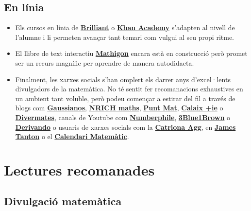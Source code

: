 \documentclass[a4paper, 12pt]{article}
\begin{document}
        \subsection*{En línia}

            \begin{itemize}
                \item Els cursos en línia de \href{https://brilliant.org/courses/}{\textbf{Brilliant}} o \href{https://es.khanacademy.org/}{\textbf{Khan Academy}} s'adapten al nivell de l'alumne i li permeten avançar tant temari com vulgui al seu propi ritme.
                \item El llibre de text interactiu \href{https://mathigon.org/}{\textbf{Mathigon}} encara està en construcció però promet ser un recurs magnífic per aprendre de manera autodidacta.
                \item Finalment, les xarxes socials s'han omplert els darrer anys d'excel·lents divulgadors de la matemàtica. No té sentit fer recomanacions exhaustives en un ambient tant voluble, però podeu començar a estirar del fil a través de blogs com \href{https://www.gaussianos.com/}{\textbf{Gaussianos}}, \href{https://nrich.maths.org/}{\textbf{NRICH maths}}, \href{https://puntmat.blogspot.com/}{\textbf{Punt Mat}}, \href{https://calaix2.blogspot.com/}{\textbf{Calaix +ie}} o \href{http://divermates.es/blog/}{\textbf{Divermates}}, canals de Youtube com \href{https://www.youtube.com/channel/UCoxcjq-8xIDTYp3uz647V5A}{\textbf{Numberphile}}, \href{https://www.youtube.com/c/3blue1brown}{\textbf{3Blue1Brown}} o \href{https://www.youtube.com/channel/UCH-Z8ya93m7_RD02WsCSZYA}{\textbf{Derivando}} o usuaris de xarxes socials com la \href{https://twitter.com/Cshearer41}{\textbf{Catriona Agg}}, en \href{https://twitter.com/jamestanton}{\textbf{James Tanton}} o el \href{https://mobile.twitter.com/Calendarimat}{\textbf{Calendari Matemàtic}}.
            \end{itemize}

    \newpage %

    \section*{Lectures recomanades}

        \subsection*{Divulgació matemàtica}
\end{document}
